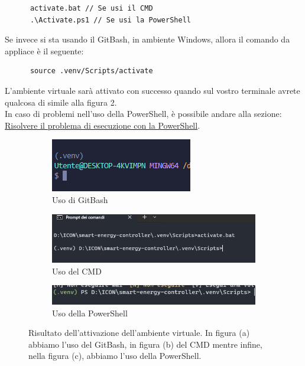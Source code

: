 \documentclass[12pt, letterpaper]{article}
\begin{document}
\begin{verbatim}
      activate.bat // Se usi il CMD
      .\Activate.ps1 // Se usi la PowerShell
\end{verbatim}

\noindent Se invece si sta usando il GitBash, in ambiente Windows, allora il comando da appliace è il seguente:

\begin{verbatim}
      source .venv/Scripts/activate
\end{verbatim}

\noindent L'ambiente virtuale sarà attivato con successo quando sul vostro terminale avrete
qualcosa di simile alla figura 2. \\

\noindent In caso di problemi nell'uso della PowerShell, è possibile andare alla
sezione: \hyperref[sec:powershell-error]{Risolvere il problema di esecuzione con la PowerShell}. \\


\begin{figure}[h]
      \centering

      \begin{subfigure}[h]{1\textwidth}
            \includegraphics{terminale-bash.png}
            \caption{Uso di GitBash}
      \end{subfigure}

      \vspace{0.5cm}

      \begin{subfigure}[h]{1\textwidth}
            \includegraphics{terminale-cmd.png}
            \caption{Uso del CMD}
      \end{subfigure}

      \vspace{0.5cm}

      \begin{subfigure}[h]{1\textwidth}
            \includegraphics{terminale-powershell.png}
            \caption{Uso della PowerShell}
      \end{subfigure}

      \caption{
            Risultato dell'attivazione dell'ambiente virtuale. In figura (a) abbiamo
            l'uso del GitBash, in figura (b) del CMD mentre infine, nella figura
            (c), abbiamo l'uso della PowerShell.
      }
\end{figure}
\end{document}
